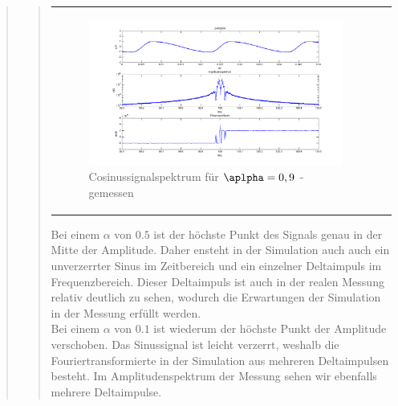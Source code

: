 \begin{quote}
\begin{quote}
\begin{center}
\begin{tabular}{ll}
\begin{minipage}{0.6\textwidth}
                    \begin{figure}[H]
                        \label{fig:}            
                        \includegraphics[scale=0.3]{./Bilder/cos_alpha9_-_gemessen.png} %
                        \caption{Cosinussignalspektrum für $\aplpha = 0,9$ - gemessen}
                    \end{figure}                
                 \vspace{-1.5em}

                \end{minipage}

            \end{tabular}
            \end{center}
        
            
            Bei einem $\alpha$ von $0.5$ ist der höchste Punkt des Signals genau
            in der Mitte der Amplitude. Daher ensteht in der Simulation auch
            auch ein unverzerrter Sinus im Zeitbereich und ein einzelner
            Deltaimpuls im Frequenzbereich. Dieser Deltaimpuls ist auch in
            der realen Messung relativ deutlich zu sehen, wodurch die
            Erwartungen der Simulation in der Messung erfüllt werden.\\
            
            Bei einem $\alpha$ von $0.1$ ist wiederum der höchste Punkt der Amplitude verschoben. 
            Das Sinussignal ist leicht verzerrt, weshalb die Fouriertransformierte 
            in der Simulation aus mehreren Deltaimpulsen besteht. Im
            Amplitudenspektrum der Messung sehen wir ebenfalls mehrere Deltaimpulse.\\
            

\end{quote}
\end{quote}
